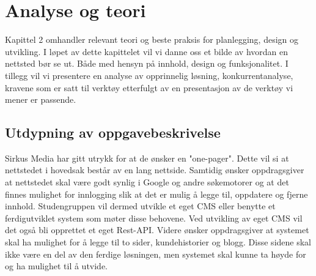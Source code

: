 \cleardoublepage
\chapter{Analyse og teori}
\label{chap:analysis}



Kapittel 2 omhandler relevant teori og beste praksis for planlegging, design og utvikling. I løpet av dette kapittelet vil vi danne oss et bilde av hvordan en nettsted bør se ut. Både med hensyn på innhold, design og funksjonalitet. I tillegg vil vi presentere en analyse av opprinnelig løsning, konkurrentanalyse, kravene som er satt til verktøy etterfulgt av en presentasjon av de verktøy vi mener er passende.

\section{Utdypning av oppgavebeskrivelse}
Sirkus Media har gitt utrykk for at de ønsker en "one-pager". Dette vil si at nettstedet i hovedsak består av en lang nettside. Samtidig ønsker oppdragsgiver at nettstedet skal være godt synlig i Google og andre søkemotorer og at det finnes mulighet for innlogging slik at det er mulig å legge til, oppdatere og fjerne innhold. Studengruppen vil dermed utvikle et eget CMS eller benytte et ferdigutviklet system som møter disse behovene. Ved utvikling av eget CMS vil det også bli opprettet et eget Rest-API. Videre ønsker oppdragsgiver at systemet skal ha mulighet for å legge til to sider, kundehistorier og blogg. Disse sidene skal ikke være en del av den ferdige løsningen, men systemet skal kunne ta høyde for og ha mulighet til å utvide.

